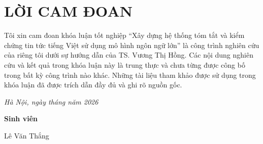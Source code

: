 \chapter*{LỜI CAM ĐOAN}

Tôi xin cam đoan khóa luận tốt nghiệp ``Xây dựng hệ thống tóm tắt và kiểm chứng tin tức tiếng Việt sử dụng mô hình ngôn ngữ lớn'' là công trình nghiên cứu của riêng tôi dưới sự hướng dẫn của TS. Vương Thị Hồng. Các nội dung nghiên cứu và kết quả trong khóa luận này là trung thực và chưa từng được công bố trong bất kỳ công trình nào khác. Những tài liệu tham khảo được sử dụng trong khóa luận đã được trích dẫn đầy đủ và ghi rõ nguồn gốc.

\vspace{2cm}

\begin{flushright}
\textit{Hà Nội, ngày \hspace{1cm} tháng \hspace{1cm} năm 2026}

\vspace{1cm}

\textbf{Sinh viên}

\vspace{1.5cm}

Lê Văn Thắng
\end{flushright}

